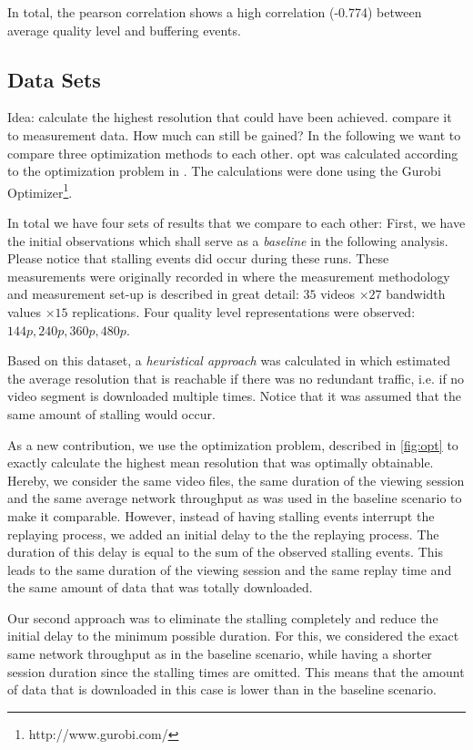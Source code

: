 In total, the pearson correlation shows a high correlation (-0.774) between average quality level and buffering events.
\subsection{Data Sets}

Idea: calculate the highest resolution that could have been achieved. compare it to measurement data. How much can still be gained?
In the following we want to compare three optimization methods to each other.
opt was calculated according to the optimization problem in \cite{hossfeld2015identifying}. The calculations were done using the Gurobi Optimizer\footnote{http://www.gurobi.com/}.

In total we have four sets of results that we compare to each other:
First, we have the initial observations which shall serve as a \textit{baseline} in the following analysis. Please notice that stalling events did occur during these runs. These measurements were originally recorded in \cite{sieber16sacrificing} where the measurement methodology and measurement set-up is described in great detail: $35$ videos $\times 27$ bandwidth values $\times 15$ replications. Four quality level representations were observed: $144p, 240p, 360p, 480p$.

Based on this dataset, a \textit{heuristical approach} was calculated in \cite{sieber16sacrificing} which estimated the average resolution that is reachable if there was no redundant traffic, i.e. if no video segment is downloaded multiple times. Notice that it was assumed that the same amount of stalling would occur.

As a new contribution, we use the optimization problem, described in \ref{fig:opt} to exactly calculate the highest mean resolution that was optimally obtainable. Hereby, we consider the same video files, the same duration of the viewing session and the same average network throughput as was used in the baseline scenario to make it comparable. However, instead of having stalling events interrupt the replaying process, we added an initial delay to the the replaying process. The duration of this delay is equal to the sum of the observed stalling events. This leads to the same duration of the viewing session and the same replay time and the same amount of data that was totally downloaded.

Our second approach was to eliminate the stalling completely and reduce the initial delay to the minimum possible duration. For this, we considered the exact same network throughput as in the baseline scenario, while having a shorter session duration since the stalling times are omitted. This means that the amount of data that is downloaded in this case is lower than in the baseline scenario.

